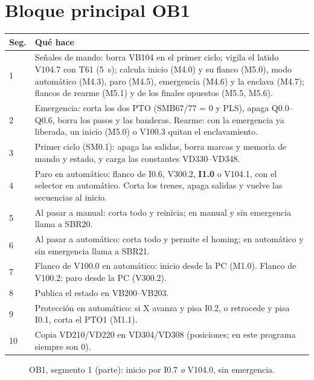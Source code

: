 \section{Bloque principal OB1}
\begin{center}\small
\begin{longtable}{>{\raggedright}p{1.2cm} >{\raggedright\arraybackslash}p{13.8cm}}
\toprule
\textbf{Seg.} & \textbf{Qué hace}\\
\midrule
\endhead
1 & Señales de mando: borra VB104 en el primer ciclo; vigila el latido V104.7 con T61 (5~s); calcula inicio (M4.0) y su flanco (M5.0), modo automático (M4.3), paro (M4.5), emergencia (M4.6) y la enclava (M4.7); flancos de rearme (M5.1) y de los finales opuestos (M5.5, M5.6).\\
2 & Emergencia: corta los dos PTO (SMB67/77 = 0 y PLS), apaga Q0.0--Q0.6, borra los pasos y las banderas. Rearme: con la emergencia ya liberada, un inicio (M5.0) o V100.3 quitan el enclavamiento.\\
3 & Primer ciclo (SM0.1): apaga las salidas, borra marcas y memoria de mando y estado, y carga las constantes VD330--VD348.\\
4 & Paro en automático: flanco de I0.6, V300.2, \textbf{I1.0} o V104.1, con el selector en automático. Corta los trenes, apaga salidas y vuelve las secuencias al inicio.\\
5 & Al pasar a manual: corta todo y reinicia; en manual y sin emergencia llama a SBR20.\\
6 & Al pasar a automático: corta todo y permite el homing; en automático y sin emergencia llama a SBR21.\\
7 & Flanco de V100.0 en automático: inicio desde la PC (M1.0). Flanco de V100.2: paro desde la PC (V300.2).\\
8 & Publica el estado en VB200--VB203.\\
9 & Protección en automático: si X avanza y pisa I0.2, o retrocede y pisa I0.1, corta el PTO1 (M1.1).\\
10 & Copia VD210/VD220 en VD304/VD308 (posiciones; en este programa siempre son 0).\\
\bottomrule
\end{longtable}
\end{center}

\begin{figure}[H]
\centering
{}
\caption{OB1, segmento 1 (parte): inicio por I0.7 \emph{o} V104.0, sin emergencia.}
\end{figure}

